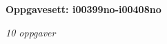 \centerline{\bf Oppgavesett: i00399no-i00408no}
\vskip 10pt
\centerline{\it 10 oppgaver}\vskip 10pt
\vskip 10pt
